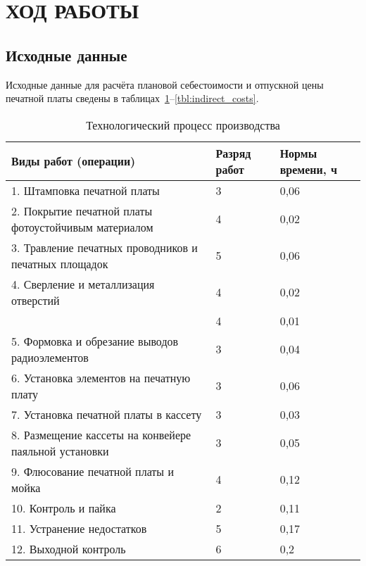 \section{ХОД РАБОТЫ}

\subsection{Исходные данные}

Исходные данные для расчёта плановой себестоимости и отпускной цены
печатной платы сведены в
таблицах~\ref{tbl:technological_process}--\ref{tbl:indirect_costs}.

\begin{table}[h!]
  \caption{Технологический процесс производства}
  \label{tbl:technological_process}
  \centering
  \small{
    \begin{tabular}{| p{} | p{} | p{} |}
      \hline

      Виды работ (операции) & Разряд работ & Нормы времени, ч \\ \hline

      1. Штамповка печатной платы                                     & 3 & 0,06 \\ \hline
      2. Покрытие печатной платы \newline фотоустойчивым материалом   & 4 & 0,02 \\ \hline
      3. Травление печатных проводников \newline и печатных площадок  & 5 & 0,06 \\ \hline
      4. Сверление и металлизация отверстий                           & 4 & 0,02 \\ \cline{2-3}
                                                                      & 4 & 0,01 \\ \hline
      5. Формовка и обрезание выводов радиоэлементов                  & 3 & 0,04 \\ \hline
      6. Установка элементов на печатную плату                        & 3 & 0,06 \\ \hline
      7. Установка печатной платы в кассету                           & 3 & 0,03 \\ \hline
      8. Размещение кассеты \newline на конвейере паяльной установки  & 3 & 0,05 \\ \hline
      9. Флюсование печатной платы и мойка                            & 4 & 0,12 \\ \hline
      10. Контроль и пайка                                            & 2 & 0,11 \\ \hline
      11. Устранение недостатков                                      & 5 & 0,17 \\ \hline
      12. Выходной контроль                                           & 6 & 0,2  \\ \hline

    \end{tabular}
  }
\end{table}

